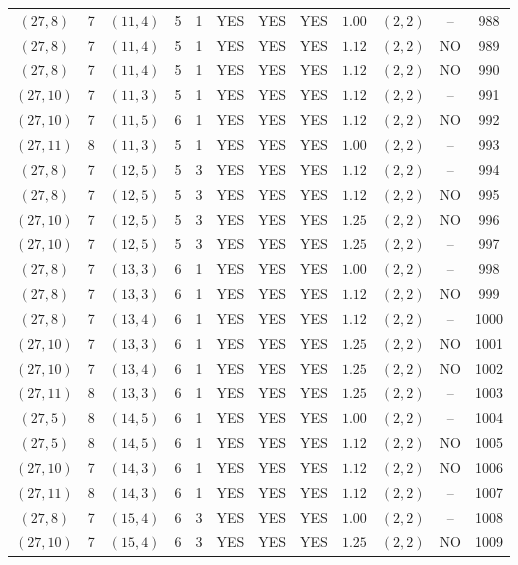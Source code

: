 \begin{longtable}{|c|c|c|c|c|c|c|c|c|c|c|c|}
$(27,8)$ & 7 & $(11,4)$ & 5 & 1 & YES & YES & YES & $1.00$ & $(2,2)$ & -- & 988\\
$(27,8)$ & 7 & $(11,4)$ & 5 & 1 & YES & YES & YES & $1.12$ & $(2,2)$ & NO & 989\\
$(27,8)$ & 7 & $(11,4)$ & 5 & 1 & YES & YES & YES & $1.12$ & $(2,2)$ & NO & 990\\
$(27,10)$ & 7 & $(11,3)$ & 5 & 1 & YES & YES & YES & $1.12$ & $(2,2)$ & -- & 991\\
$(27,10)$ & 7 & $(11,5)$ & 6 & 1 & YES & YES & YES & $1.12$ & $(2,2)$ & NO & 992\\
$(27,11)$ & 8 & $(11,3)$ & 5 & 1 & YES & YES & YES & $1.00$ & $(2,2)$ & -- & 993\\
$(27,8)$ & 7 & $(12,5)$ & 5 & 3 & YES & YES & YES & $1.12$ & $(2,2)$ & -- & 994\\
$(27,8)$ & 7 & $(12,5)$ & 5 & 3 & YES & YES & YES & $1.12$ & $(2,2)$ & NO & 995\\
$(27,10)$ & 7 & $(12,5)$ & 5 & 3 & YES & YES & YES & $1.25$ & $(2,2)$ & NO & 996\\
$(27,10)$ & 7 & $(12,5)$ & 5 & 3 & YES & YES & YES & $1.25$ & $(2,2)$ & -- & 997\\
$(27,8)$ & 7 & $(13,3)$ & 6 & 1 & YES & YES & YES & $1.00$ & $(2,2)$ & -- & 998\\
$(27,8)$ & 7 & $(13,3)$ & 6 & 1 & YES & YES & YES & $1.12$ & $(2,2)$ & NO & 999\\
$(27,8)$ & 7 & $(13,4)$ & 6 & 1 & YES & YES & YES & $1.12$ & $(2,2)$ & -- & 1000\\
$(27,10)$ & 7 & $(13,3)$ & 6 & 1 & YES & YES & YES & $1.25$ & $(2,2)$ & NO & 1001\\
$(27,10)$ & 7 & $(13,4)$ & 6 & 1 & YES & YES & YES & $1.25$ & $(2,2)$ & NO & 1002\\
$(27,11)$ & 8 & $(13,3)$ & 6 & 1 & YES & YES & YES & $1.25$ & $(2,2)$ & -- & 1003\\
$(27,5)$ & 8 & $(14,5)$ & 6 & 1 & YES & YES & YES & $1.00$ & $(2,2)$ & -- & 1004\\
$(27,5)$ & 8 & $(14,5)$ & 6 & 1 & YES & YES & YES & $1.12$ & $(2,2)$ & NO & 1005\\
$(27,10)$ & 7 & $(14,3)$ & 6 & 1 & YES & YES & YES & $1.12$ & $(2,2)$ & NO & 1006\\
$(27,11)$ & 8 & $(14,3)$ & 6 & 1 & YES & YES & YES & $1.12$ & $(2,2)$ & -- & 1007\\
$(27,8)$ & 7 & $(15,4)$ & 6 & 3 & YES & YES & YES & $1.00$ & $(2,2)$ & -- & 1008\\
$(27,10)$ & 7 & $(15,4)$ & 6 & 3 & YES & YES & YES & $1.25$ & $(2,2)$ & NO & 1009\\

\end{longtable}
